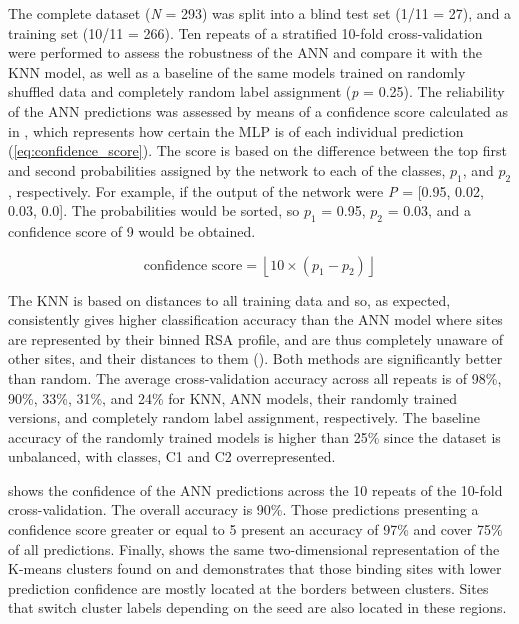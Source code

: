The complete dataset (\textit{N} = 293) was split into a blind test set (1/11 = 27), and a training set (10/11 = 266). Ten repeats of a stratified 10-fold cross-validation were performed to assess the robustness of the ANN and compare it with the KNN model, as well as a baseline of the same models trained on randomly shuffled data and completely random label assignment (\textit{p} = 0.25). The reliability of the ANN predictions was assessed by means of a confidence score calculated as in \cite{CUFF_2000_PROFILES}, which represents how certain the MLP is of each individual prediction (\autoref{eq:confidence_score}). The score is based on the difference between the top first and second probabilities assigned by the network to each of the classes, $p_{1}$, and $p_{2}$, respectively. For example, if the output of the network were \textit{P} = [0.95, 0.02, 0.03, 0.0]. The probabilities would be sorted, so $p_{1}$ = 0.95, $p_{2}$ = 0.03, and a confidence score of 9 would be obtained.

\vspace{-12pt} %

\begin{equation}
\text{confidence score} = \left\lfloor 10 \times (p_1 - p_2) \right\rfloor
\label{eq:confidence_score}
\end{equation}

\vspace{-20pt} %

The KNN is based on distances to all training data and so, as expected, consistently gives higher classification accuracy than the ANN model where sites are represented by their binned RSA profile, and are thus completely unaware of other sites, and their distances to them (). Both methods are significantly better than random. The average cross-validation accuracy across all repeats is of 98\%, 90\%, 33\%, 31\%, and 24\% for KNN, ANN models, their randomly trained versions, and completely random label assignment, respectively. The baseline accuracy of the randomly trained models is higher than 25\% since the dataset is unbalanced, with classes, C1 and C2 overrepresented.

 shows the confidence of the ANN predictions across the 10 repeats of the 10-fold cross-validation. The overall accuracy is 90\%. Those predictions presenting a confidence score greater or equal to 5 present an accuracy of 97\% and cover 75\% of all predictions. Finally,  shows the same two-dimensional representation of the K-means clusters found on  and demonstrates that those binding sites with lower prediction confidence are mostly located at the borders between clusters. Sites that switch cluster labels depending on the seed are also located in these regions.

